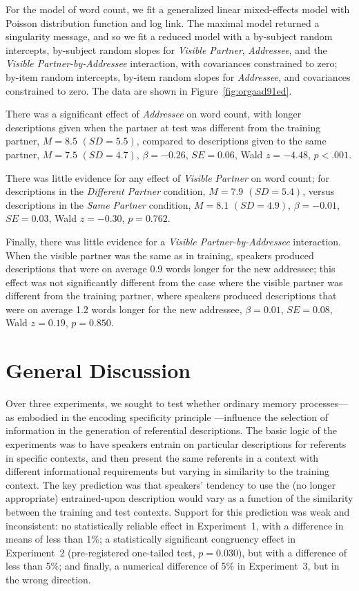 \documentclass[natbib,man,a4paper]{apa6}
\begin{document}
For the model of word count, we fit a generalized linear mixed-effects model with Poisson distribution function and log link.  The maximal model returned a singularity message, and so we fit a reduced model with a by-subject random intercepts, by-subject random slopes for \emph{Visible Partner}, \emph{Addressee}, and the \emph{Visible Partner-by-Addressee} interaction, with covariances constrained to zero; by-item random intercepts, by-item random slopes for \emph{Addressee}, and covariances constrained to zero. The data are shown in Figure~\ref{fig:orgaad91ed}.

There was a significant effect of \emph{Addressee} on word count, with longer descriptions given when the partner at test was different from the training partner,
\(M = 8.5\)  \((SD = 5.5)\),
compared to descriptions given to the same partner,
\(M = 7.5\)  \((SD = 4.7)\),
\(\beta = -0.26\), \(SE = 0.06\), Wald \(z = -4.48\), \(p < .001\).

There was little evidence for any effect of \emph{Visible Partner} on word count; 
for descriptions in the \emph{Different Partner} condition,
\(M = 7.9\)  \((SD = 5.4)\),
versus descriptions in the \emph{Same Partner} condition,
\(M = 8.1\)  \((SD = 4.9)\),
\(\beta = -0.01\), \(SE = 0.03\), Wald \(z = -0.30\), \(p = 0.762\).

Finally, there was little evidence for a \emph{Visible Partner-by-Addressee} interaction. When the visible partner was the same as in training, speakers produced descriptions that were on average 
0.9 
words longer for the new addressee; 
this effect was not significantly different from the case where the visible partner was different from the training partner, where speakers produced descriptions that were on average
1.2
words longer for the new addressee,
\(\beta = 0.01\), \(SE = 0.08\), Wald \(z = 0.19\), \(p = 0.850\).

\section*{General Discussion}
\label{sec:orga62f51b}
Over three experiments, we sought to test whether ordinary memory processes---as embodied in the encoding specificity principle \citep{tulvingthomson73}---influence the selection of information in the generation of referential descriptions. The basic logic of the experiments was to have speakers entrain on particular descriptions for referents in specific contexts, and then present the same referents in a context with different informational requirements but varying in similarity to the training context. The key prediction was that speakers' tendency to use the (no longer appropriate) entrained-upon description would vary as a function of the similarity between the training and test contexts. Support for this prediction was weak and inconsistent: no statistically reliable effect in Experiment~1, with a difference in means of less than 1\%; a statistically significant congruency effect in Experiment~2 (pre-registered one-tailed test, \(p =\)0.030), but with a difference of less than 5\%; and finally, a numerical difference of 5\% in Experiment~3, but in the wrong direction.
\end{document}
